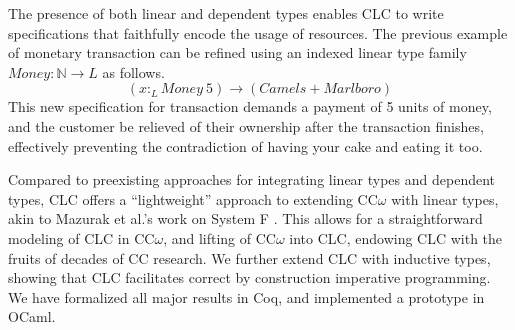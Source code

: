 \documentclass[sigplan,screen,review,authordraft]{acmart}
\theoremstyle{definition}
\newcommand{\ltype}{:_{\scriptscriptstyle L}}
\begin{document}
  The presence of both linear and dependent types enables CLC to write specifications that faithfully encode the usage of resources. The previous example of monetary transaction can be refined using an indexed linear type family $Money : \mathbb{N} \rightarrow L$ as follows.
  \begin{equation*}
    (x \ltype Money\ 5) \rightarrow (Camels + Marlboro)
  \end{equation*}
  This new specification for transaction demands a payment of 5 units of money, and the customer be relieved of their ownership after the transaction finishes, effectively preventing the contradiction of having your cake and eating it too.

  Compared to preexisting approaches for integrating linear types and dependent types, CLC offers a ``lightweight'' approach to extending CC$\omega$ with linear types, akin to Mazurak et al.'s work on System F \cite{mazurak}. This allows for a straightforward modeling of CLC in CC$\omega$, and lifting of CC$\omega$ into CLC, endowing CLC with the fruits of decades of CC research. We further extend CLC with inductive types, showing that CLC facilitates correct by construction imperative programming. We have formalized all major results in Coq, and implemented a prototype in OCaml. 

  \medskip
\end{document}
